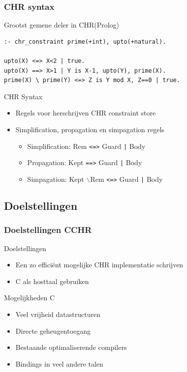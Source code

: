 \documentclass{beamer}
\newcommand{\bs}{$\backslash$}
\newcommand{\code}[1]{{\tt #1}}
\begin{document}
\begin{frame}[containsverbatim]
  \frametitle{CHR syntax}
  \begin{example}{Grootst gemene deler in CHR(Prolog)}
\begin{Verbatim}
:- chr_constraint prime(+int), upto(+natural).

upto(X) <=> X<2 | true.
upto(X) ==> X>1 | Y is X-1, upto(Y), prime(X).
prime(X) \ prime(Y) <=> Z is Y mod X, Z==0 | true.
\end{Verbatim}
  \end{example}

  \begin{block}{CHR Syntax}
    \begin{itemize}
      \item Regels voor herschrijven CHR constraint store
      \item Simplification, propagation en simpagation regels \begin{itemize}
        \item Simplification: {Rem} \code{<=>} {Guard} \code{|} {Body}
        \item Propagation: {Kept} \code{==>} {Guard} \code{|} {Body}
        \item Simpagation: {Kept} \bs {Rem} \code{<=>} {Guard} \code{|} {Body}
      \end{itemize}
    \end{itemize}
  \end{block}
\end{frame}

\subsection{Doelstellingen}

\begin{frame}
  \frametitle{Doelstellingen CCHR}
  \begin{block}{Doelstellingen}
    \begin{itemize}
      \item Een zo effici\"ent mogelijke CHR implementatie schrijven
      \item C als hosttaal gebruiken
    \end{itemize}
  \end{block}

  \begin{block}{Mogelijkheden C}
    \begin{itemize}
      \item Veel vrijheid datastructuren
      \item Directe geheugentoegang
      \item Bestaande optimaliserende compilers
      \item Bindings in veel andere talen
    \end{itemize}
  \end{block}

\end{frame}
\end{document}
